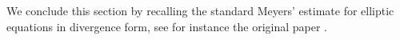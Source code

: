\documentclass[11pt,a4paper,oneside]{amsart}
\numberwithin{equation}{section}
\newcommand{\lessim}{\stackrel{<}{\sim}}
\newtheorem{lemma}[theorem]{Lemma}
\newcommand{\dd}{\mathrm{d}}
\newcommand{\hw}[1]{{\color{darkblue}{#1}}}
\begin{document}
%
%
%
%
%
%
%
%
%
%
We conclude this section by recalling the standard Meyers' estimate for elliptic equations in divergence form, see for instance the original paper \cite{meyers1963p}.
\end{document}
